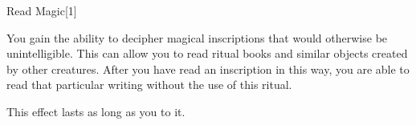 \begin{spellsection}{Read Magic}[1]

\begin{spellcontent}

\begin{spelltargetinginfo}




\end{spelltargetinginfo}


\begin{spelleffects}



\spelleffect
You gain the ability to decipher magical inscriptions that would otherwise be unintelligible.
This can allow you to read ritual books and similar objects created by other creatures.
After you have read an inscription in this way, you are able to read that particular writing without the use of this ritual.

This effect lasts as long as you  to it.








\end{spelleffects}

\end{spellcontent}
\begin{spellfooter}


\end{spellfooter}
\begin{spellsubcontent}


\end{spellsubcontent}
\end{spellsection}


